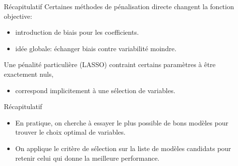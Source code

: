 \documentclass[
  ignorenonframetext,
]{beamer}
\providecommand{\tightlist}{%
  \setlength{\itemsep}{0pt}\setlength{\parskip}{0pt}}\usepackage{longtable,booktabs,array}
\begin{document}
\begin{frame}{Récapitulatif}
\protect\hypertarget{ruxe9capitulatif-3}{}
Certaines méthodes de pénalisation directe changent la fonction
objective:

\begin{itemize}
\tightlist
\item
  introduction de biais pour les coefficients.
\item
  idée globale: échanger biais contre variabilité moindre.
\end{itemize}

Une pénalité particulière (LASSO) contraint certains paramètres à être
exactement nuls,

\begin{itemize}
\tightlist
\item
  correspond implicitement à une sélection de variables.
\end{itemize}
\end{frame}

\begin{frame}{Récapitulatif}
\protect\hypertarget{ruxe9capitulatif-4}{}
\begin{itemize}
\tightlist
\item
  En pratique, on cherche à essayer le plus possible de bons modèles
  pour trouver le choix optimal de variables.
\item
  On applique le critère de sélection sur la liste de modèles candidats
  pour retenir celui qui donne la meilleure performance.
\end{itemize}
\end{frame}
\end{document}
